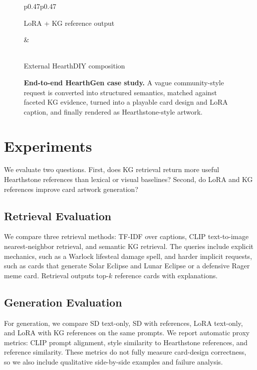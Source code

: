 \documentclass[10pt,twocolumn,letterpaper]{article}
\begin{document}
\begin{figure}[t]
\begin{tabular}{p{0.47\textwidth}p{0.47\textwidth}}
\begin{minipage}[t]{0.47\textwidth}
{\scriptsize LoRA + KG reference output}
\end{minipage}
&
\begin{minipage}[t]{0.47\textwidth}
\centering
{}\\[-0.2em]
{\scriptsize External HearthDIY composition}
\end{minipage}
\end{tabular}
\caption{\textbf{End-to-end HearthGen case study.} A vague community-style request is converted into structured semantics, matched against faceted KG evidence, turned into a playable card design and LoRA caption, and finally rendered as Hearthstone-style artwork.}
\label{fig:overview}
\end{figure}

\section{Experiments}

We evaluate two questions. First, does KG retrieval return more useful Hearthstone references than lexical or visual baselines? Second, do LoRA and KG references improve card artwork generation?

\subsection{Retrieval Evaluation}

We compare three retrieval methods: TF-IDF over captions, CLIP text-to-image nearest-neighbor retrieval, and semantic KG retrieval. The queries include explicit mechanics, such as a Warlock lifesteal damage spell, and harder implicit requests, such as cards that generate Solar Eclipse and Lunar Eclipse or a defensive Rager meme card. Retrieval outputs top-$k$ reference cards with explanations.

\subsection{Generation Evaluation}

For generation, we compare SD text-only, SD with references, LoRA text-only, and LoRA with KG references on the same prompts. We report automatic proxy metrics: CLIP prompt alignment, style similarity to Hearthstone references, and reference similarity. These metrics do not fully measure card-design correctness, so we also include qualitative side-by-side examples and failure analysis.
\end{document}
